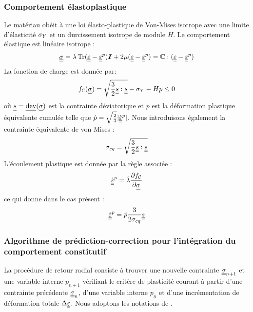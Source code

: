 \documentclass[10pt]{book}
\begin{document}
\begin{appendices}
\subsubsection{Comportement élastoplastique}
Le matériau obéit à une loi élasto-plastique de Von-Mises isotrope avec une limite d'élasticité $\sigma_{Y}$ et un durcissement isotrope de module $H$. Le comportement élastique est linéaire isotrope :
$$\SC = \lambda \tr(\DefoHPP-\EpsP)\bI + 2\mu(\DefoHPP-\EpsP) = \RigiLin:(\DefoHPP-\EpsP)$$
La fonction de charge est donnée par:
$$f_{\mathcal{C}}(\underline{\underline{\sigma}}) = \sqrt{\frac{3}{2}\underline{\underline{s}}:\underline{\underline{s}}} - \sigma_{Y} -Hp \leq 0$$
où $\devia = \dev(\SC)$ est la contrainte déviatorique et $p$ est la déformation plastique équivalente cumulée telle que $\dot{p} = \sqrt{\frac{2}{3}}|\dot{\underline{\underline{\varepsilon}}}^{p}|$. Nous introduisons également la contrainte équivalente de von Mises :
$$\sigma_{eq} =  \sqrt{\frac{3}{2}\underline{\underline{s}}:\underline{\underline{s}}}$$
L'écoulement plastique est donnée par la règle associée :
$$\dot{\underline{\underline{\varepsilon}}}^{p} = \dot{\lambda}\dfrac{\partial f_{\mathcal{C}}}{\partial \underline{\underline{\sigma}}}$$
ce qui donne dans le cas présent :
\begin{equation}
\dot{\underline{\underline{\varepsilon}}}^{p} = \dot{p}\dfrac{3}{2\sigma_{eq}}\underline{\underline{s}}
\label{eq:flow-rule}
\end{equation}
\subsubsection{Algorithme de prédiction-correction pour l'intégration du comportement constitutif}
La procédure de retour radial consiste à trouver une nouvelle contrainte $\underline{\underline{\sigma}}_{n+1}$ et une variable interne $p_{n+1}$ vérifiant le critère de plasticité courant à partir d'une contrainte précédente $\underline{\underline{\sigma}}_{n}$, d'une variable interne $p_n$ et d'une incrémentation de déformation totale $\Delta \underline{\underline{\varepsilon}}$. Nous adoptons les notations de \cite{bonnet2014finite}.


\end{appendices}
\end{document}

